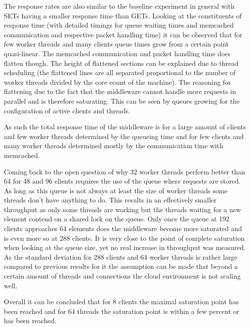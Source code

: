             The response rates are also similar to the baseline experiment in general with SETs having a smaller
            response time than GETs. Looking at the constituents of response time (with detailed timings for queue
            waiting times and memcached communication and respective packet handling time) it can be observed that for
            few worker threads and many clients queue times grow from a certain point quasi-linear. The memcached
            communication and packet handling time does flatten though. The height of flattened sections can be
            explained due to thread scheduling (the flattened lines are all separated proportional to the number of
            worker threads divided by the core count of the machine). The reasoning for flattening due to the fact that
            the middleware cannot handle more requests in parallel and is therefore saturating. This can be seen by
            queues growing for the configuration of active clients and threads.

            As such the total response time of the middleware is for a large amount of clients and few worker threads
            determined by the queueing time and for few clients and many worker threads determined mostly by the
            communication time with memcached.

            Coming back to the open question of why 32 worker threads perform better than 64 for 48 and 96 clients
            requires the use of the queue where requests are stored. As long as this queue is not always at least the
            size of worker threads some threads don't have anything to do. This results in an effectively smaller
            throughput as only some threads are working but the threads waiting for a new element contend on a shared
            lock on the queue. Only once the queue at 192 clients approaches 64 elements does the middleware become more
            saturated and is even more so at 288 clients. It is very close to the point of complete saturation when
            looking at the queue size, yet no real increase in throughput was measured. As the standard deviation for
            288 clients and 64 worker threads is rather large compared to previous results for it the assumption can be
            made that beyond a certain amount of threads and connections the cloud environment is not scaling well.

            Overall it can be concluded that for 8 clients the maximal saturation point has been reached
            and for 64 threads the saturation point is within a few percent or has been reached.

